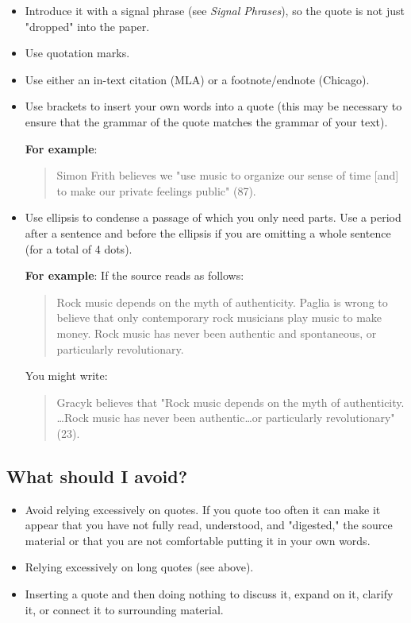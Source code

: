  \begin{itemize}       	
\item Introduce it with a signal phrase (see \emph{Signal Phrases}), so the quote is not 
just "dropped" into the paper.

\item Use quotation marks.

\item Use either an in-text citation (MLA) or a footnote/endnote (Chicago).
        	
\item Use brackets to insert your own words into a quote (this may be necessary to 
ensure that the grammar of the quote matches the grammar of your text).

\textbf{For example}:

\begin{quote} Simon Frith believes we "use music to organize our sense of time [and] 
to make our private feelings public" (87). 
\end{quote}

\item Use ellipsis to condense a passage of which you only need parts. Use a period 
after a sentence and before the ellipsis if you are omitting a whole sentence (for a 
total of 4
dots).

\textbf{For example}:
 If the source reads as follows:
\begin{quote}
Rock music depends on the myth of authenticity. Paglia is wrong to believe that only 
contemporary rock musicians play music to make money. Rock music has never been 
authentic and spontaneous, or particularly revolutionary.
\end{quote}
         
You might write:
\begin{quote}
Gracyk believes that "Rock music depends on the myth of authenticity. \ldots Rock 
music has never been authentic\ldots  or particularly revolutionary" (23).
 \end{quote}
 \end{itemize}
 
\subsection{What should I avoid?}

\begin{itemize}
\item Avoid relying excessively on quotes. If you quote too often it can make it appear 
that you have not fully read, understood, and "digested," the source material or that 
you are not comfortable putting it in your own words.

\item Relying excessively on long quotes (see above).

\item Inserting a quote and then doing nothing to discuss it, expand on it, clarify it, or 
connect it to surrounding material.

\end{itemize}


